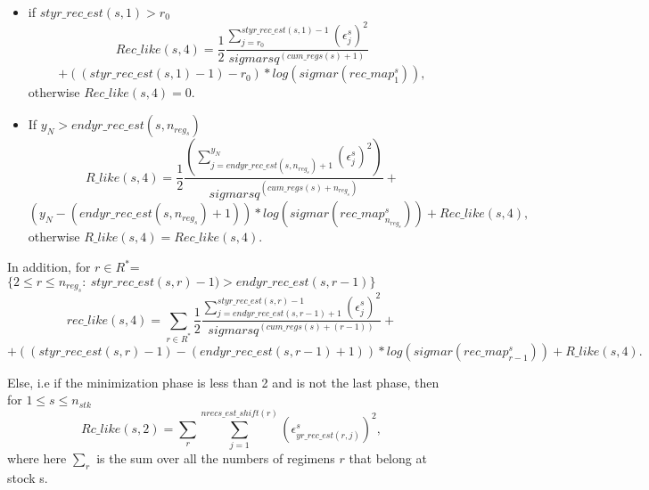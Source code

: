 \documentclass{article}
\begin{document}
\begin{itemize}
    \item if $styr\_rec\_est(s,1)>r_0$
    \begin{equation}
        Rec\_like(s,4) =  \dfrac{1}{2}\dfrac{\displaystyle\sum_{j=r_0}^{styr\_rec\_est(s,1)-1}(\epsilon^s_j)^2}{sigmarsq^{(cum\_regs(s)+1)}} 
    \end{equation}
    \begin{equation*}
        + ((styr\_rec\_est(s,1)-1)-r_0)*log(sigmar(rec\_map^s_1)),
    \end{equation*}
    otherwise $Rec\_like(s,4)=0$.
    \item If $y_N > endyr\_rec\_est(s,n_{reg_s})$
    \begin{equation}
        R\_like(s,4) =  \dfrac{1}{2}\dfrac{\displaystyle\left(\sum_{j=endyr\_rec\_est(s,n_{reg_s})+1}^{y_N}(\epsilon^s_j )^2\right)}{sigmarsq^{(cum\_regs(s)+n_{reg_s})}} + 
    \end{equation}
    \begin{equation*}
        (y_N-(endyr\_rec\_est(s,n_{reg_s})+1))*log(sigmar(rec\_map^s_{n_{reg_s}})) + Rec\_like(s,4),
    \end{equation*}
    otherwise $R\_like(s,4)=Rec\_like(s,4)$.
\end{itemize}
In addition, for $r\in R^*$=$\{2\leq r \leq n_{reg_s}: \ styr\_rec\_est(s,r)-1) > endyr\_rec\_est(s,r-1)\}$
\begin{equation}
    rec\_like(s,4) =  \sum_{r\in R^*}\dfrac{1}{2}\dfrac{\displaystyle\sum_{j=endyr\_rec\_est(s,r-1)+1}^{styr\_rec\_est(s,r)-1}( \epsilon^s_j)^2}{sigmarsq^{(cum\_regs(s)+(r-1))}} + 
\end{equation}
\begin{equation*}
    + ((styr\_rec\_est(s,r)-1)-(endyr\_rec\_est(s,r-1)+1))*log(sigmar(rec\_map^s_{r-1})) + R\_like(s,4).
\end{equation*}
















Else, i.e if the minimization phase is less than 2 and is not the last phase, then for $1\leq s \leq n_{stk}$
\begin{equation}
    Rc\_like(s,2) = \sum_{r}\sum_{j=1}^{nrecs\_est\_shift(r)}(\epsilon^s_{yr\_rec\_est(r,j)})^2, 
\end{equation} 
where here $\sum_{r}$ is the sum over all the numbers of regimens $r$ that belong  at stock s.\\
\end{document}
